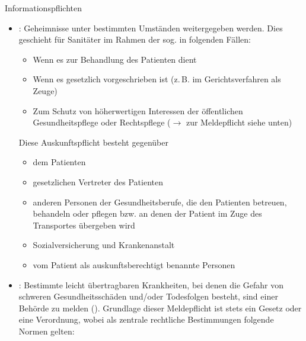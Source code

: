 \Text
{Informationspflichten}
{%

\begin{itemize}
  \item {}: \label{topic:auskunftspflicht}
  Geheimnisse 
  unter bestimmten Umständen weitergegeben werden. Dies
  geschieht für Sanitäter im Rahmen der sog.
   in folgenden
  Fällen:
  \begin{itemize}
    \item   Wenn es zur Behandlung des Patienten dient
    \item   Wenn es gesetzlich vorgeschrieben ist (z.\,B. im
    Gerichtsverfahren als Zeuge)
    \item Zum Schutz von höherwertigen Interessen der
    öffentlichen Gesundheitspflege oder Rechtspflege
    (${\rightarrow}$ zur Meldepflicht
    siehe unten)
  \end{itemize}
  Diese Auskunftspflicht besteht gegenüber
  \begin{itemize}
    \item   dem Patienten
    \item   gesetzlichen Vertreter des Patienten
    \item   anderen Personen der Gesundheitsberufe, die den
    Patienten betreuen, behandeln oder pflegen bzw. an denen
    der Patient im Zuge des Transportes übergeben wird \item
    Sozialversicherung und Krankenanstalt \item vom Patient als
    auskunftsberechtigt benannte Personen
  \end{itemize}
  \item {}: Bestimmte leicht
  übertragbaren Krankheiten, bei denen die Gefahr von
  schweren Gesundheitsschäden und/oder Todesfolgen besteht,
  sind einer Behörde zu melden (). Grundlage dieser Meldepflicht ist stets ein
  Gesetz oder eine Verordnung, wobei als zentrale rechtliche
  Bestimmungen folgende Normen gelten:
\end{itemize}}
